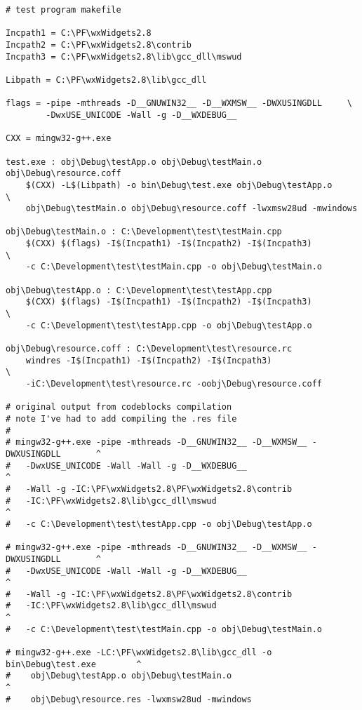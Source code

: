 \begin{verbatim}
# test program makefile

Incpath1 = C:\PF\wxWidgets2.8
Incpath2 = C:\PF\wxWidgets2.8\contrib
Incpath3 = C:\PF\wxWidgets2.8\lib\gcc_dll\mswud

Libpath = C:\PF\wxWidgets2.8\lib\gcc_dll

flags = -pipe -mthreads -D__GNUWIN32__ -D__WXMSW__ -DWXUSINGDLL     \
        -DwxUSE_UNICODE -Wall -g -D__WXDEBUG__

CXX = mingw32-g++.exe

test.exe : obj\Debug\testApp.o obj\Debug\testMain.o obj\Debug\resource.coff
    $(CXX) -L$(Libpath) -o bin\Debug\test.exe obj\Debug\testApp.o           \
    obj\Debug\testMain.o obj\Debug\resource.coff -lwxmsw28ud -mwindows

obj\Debug\testMain.o : C:\Development\test\testMain.cpp
    $(CXX) $(flags) -I$(Incpath1) -I$(Incpath2) -I$(Incpath3)               \ 
    -c C:\Development\test\testMain.cpp -o obj\Debug\testMain.o

obj\Debug\testApp.o : C:\Development\test\testApp.cpp 
    $(CXX) $(flags) -I$(Incpath1) -I$(Incpath2) -I$(Incpath3)               \
    -c C:\Development\test\testApp.cpp -o obj\Debug\testApp.o

obj\Debug\resource.coff : C:\Development\test\resource.rc
    windres -I$(Incpath1) -I$(Incpath2) -I$(Incpath3)                       \
    -iC:\Development\test\resource.rc -oobj\Debug\resource.coff

# original output from codeblocks compilation
# note I've had to add compiling the .res file
#
# mingw32-g++.exe -pipe -mthreads -D__GNUWIN32__ -D__WXMSW__ -DWXUSINGDLL       ^
#   -DwxUSE_UNICODE -Wall -Wall -g -D__WXDEBUG__                                ^
#   -Wall -g -IC:\PF\wxWidgets2.8\PF\wxWidgets2.8\contrib
#   -IC:\PF\wxWidgets2.8\lib\gcc_dll\mswud                                      ^ 
#   -c C:\Development\test\testApp.cpp -o obj\Debug\testApp.o

# mingw32-g++.exe -pipe -mthreads -D__GNUWIN32__ -D__WXMSW__ -DWXUSINGDLL       ^
#   -DwxUSE_UNICODE -Wall -Wall -g -D__WXDEBUG__                                ^
#   -Wall -g -IC:\PF\wxWidgets2.8\PF\wxWidgets2.8\contrib
#   -IC:\PF\wxWidgets2.8\lib\gcc_dll\mswud                                      ^
#   -c C:\Development\test\testMain.cpp -o obj\Debug\testMain.o

# mingw32-g++.exe -LC:\PF\wxWidgets2.8\lib\gcc_dll -o bin\Debug\test.exe        ^
#    obj\Debug\testApp.o obj\Debug\testMain.o                                   ^
#    obj\Debug\resource.res -lwxmsw28ud -mwindows

\end{verbatim}

